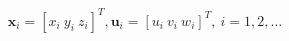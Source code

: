 \documentclass[preview]{standalone}
\begin{document}
\begin{align*}
\mathbf{x}_i = [x_i \ y_i \ z_i]^T, \mathbf{u}_i = [u_i \ v_i \ w_i]^T, \ i = 1,2,\dots
\end{align*}
\end{document}
